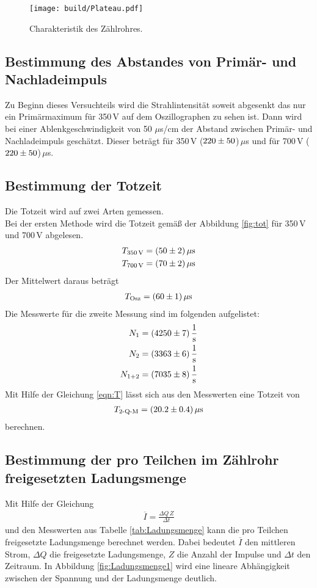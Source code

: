 \begin{figure}[H]
  \centering
  \texttt{[image: build/Plateau.pdf]}
  \caption{Charakteristik des Zählrohres.}
  \label{fig:Char1}
\end{figure}


\subsection{Bestimmung des Abstandes von Primär- und Nachladeimpuls}
Zu Beginn dieses Versuchteils wird die Strahlintensität soweit abgesenkt das nur ein Primärmaximum für 350\,V auf dem Oszillographen zu sehen ist. Dann wird bei einer Ablenkgeschwindigkeit von 50 $\mu$s/cm der Abstand zwischen Primär- und Nachladeimpuls geschätzt. Dieser beträgt für 350\,V ($\num{220 +- 50}$)\,$\mu$s und für 700\,V ($\num{220 +- 50}$)\,$\mu$s.


\subsection{Bestimmung der Totzeit}
Die Totzeit wird auf zwei Arten gemessen. \\
Bei der ersten Methode wird die Totzeit gemäß der Abbildung \eqref{fig:tot} für 350\,V und 700\,V abgelesen.
\begin{align*}
  T_\text{350\,V} = (\num{50 +- 2})\,\mu\text{s} \\
  T_\text{700\,V} = (\num{70 +- 2})\,\mu\text{s} \\
\end{align*}
Der Mittelwert daraus beträgt
\begin{align*}
  T_\text{Osz} = (\num{60 +- 1})\,\mu\text{s}
\end{align*}
Die Messwerte für die zweite Messung sind im folgenden aufgelistet:
\begin{align*}
  N_1 = (\num{4250 +- 7})\,\frac{1}{\text{s}} \\
  N_2 = (\num{3363 +- 6})\,\frac{1}{\text{s}} \\
  N_{1+2} = (\num{7035 +- 8})\,\frac{1}{\text{s}} \\
\end{align*}
Mit Hilfe der Gleichung \eqref{eqn:T} lässt sich aus den Messwerten eine Totzeit von
\begin{align*}
  T_\text{2-Q-M} = (\num{20.2 +- 0.4})\,\mu\text{s}
\end{align*}
berechnen.


\subsection{Bestimmung der pro Teilchen im Zählrohr freigesetzten Ladungsmenge}
Mit Hilfe der Gleichung
\begin{align*}
  \overline{I} = \frac{\Delta Q\,Z}{\Delta t}
\end{align*}
und den Messwerten aus Tabelle \eqref{tab:Ladungsmenge} kann die pro Teilchen freigesetzte Ladungsmenge berechnet werden. Dabei bedeutet $\overline{I}$ den mittleren Strom, $\Delta Q$ die freigesetzte Ladungsmenge, $Z$ die Anzahl der Impulse und $\Delta t$ den Zeitraum. In Abbildung \eqref{fig:Ladungsmenge1} wird eine lineare Abhängigkeit zwischen der Spannung und der Ladungsmenge deutlich.

